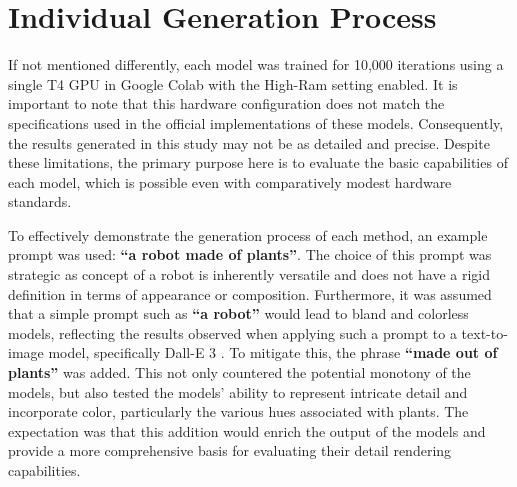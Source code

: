 \section{Individual Generation Process}\label{generationProcess}

If not mentioned differently, each model was trained for 10,000 iterations using a single T4 GPU in Google Colab with the High-Ram setting enabled. It is important to note that this hardware configuration does not match the specifications used in the official implementations of these models. Consequently, the results generated in this study may not be as detailed and precise. Despite these limitations, the primary purpose here is to evaluate the basic capabilities of each model, which is possible even with comparatively modest hardware standards.

To effectively demonstrate the generation process of each method, an example prompt was used: \textbf{``a robot made of plants''}. The choice of this prompt was strategic as concept of a robot is inherently versatile and does not have a rigid definition in terms of appearance or composition. Furthermore, it was assumed that a simple prompt such as \textbf{``a robot''} would lead to bland and colorless models, reflecting the results observed when applying such a prompt to a text-to-image model, specifically Dall-E 3 \citep{dalle3, Dall-E-3}. To mitigate this, the phrase \textbf{``made out of plants''} was added. This not only countered the potential monotony of the models, but also tested the models' ability to represent intricate detail and incorporate color, particularly the various hues associated with plants. The expectation was that this addition would enrich the output of the models and provide a more comprehensive basis for evaluating their detail rendering capabilities.\newline






